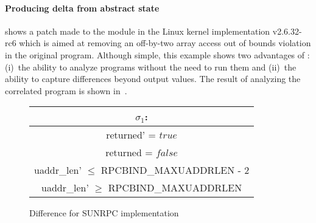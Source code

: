 %


\paragraph{Producing delta from abstract state}



 shows a patch made to the  module in the Linux kernel  implementation v2.6.32-rc6 which is aimed at removing an off-by-two array access out of bounds violation in the original program. Although simple, this example shows two advantages of {\tool}: (i)~the ability to analyze programs without the need to run them and (ii)~the ability to capture differences beyond output values. The result of analyzing the correlated program is shown in~.

\begin{figure}
\scriptsize
\centering
\begin{tabular}{c}
$\sigma_1$:
\\ \hline
returned' = $true$
\\
returned = $false$
\\
uaddr\_len' $\leq$ RPCBIND\_MAXUADDRLEN - 2
\\
uaddr\_len' $\geq$ RPCBIND\_MAXUADDRLEN
\\ \hline
\end{tabular}
\caption{Difference for SUNRPC implementation}\label{Fi:sunrpc}

\end{figure}

